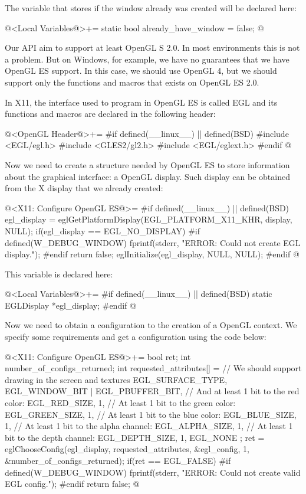 The variable that stores if the window already was created will be
declared here:

\iniciocodigo
@<Local Variables@>+=
static bool already_have_window = false;
@
\fimcodigo


Our API aim to support at least OpenGL S 2.0. In most environments
this is not a problem. But on Windows, for example, we have no
guarantees that we have OpenGL ES support. In this case, we should use
OpenGL 4, but we should support only the functions and macros that
exists on OpenGL ES 2.0.


In X11, the interface used to program in OpenGL ES is called EGL and
its functions and macros are declared in the following header:

\iniciocodigo
@<OpenGL Header@>+=
#if defined(__linux__) || defined(BSD)
#include <EGL/egl.h>
#include <GLES2/gl2.h>
#include <EGL/eglext.h>
#endif
@
\fimcodigo

Now we need to create a structure needed by OpenGL ES to store
information about the graphical interface: a OpenGL display. Such
display can be obtained from the X display that we already created:

\iniciocodigo
@<X11: Configure OpenGL ES@>=
#if defined(__linux__) || defined(BSD)
egl_display = eglGetPlatformDisplay(EGL_PLATFORM_X11_KHR, display,
                                    NULL);
if(egl_display == EGL_NO_DISPLAY){
#if defined(W_DEBUG_WINDOW)
  fprintf(stderr, "ERROR: Could not create EGL display.\n");
#endif
  return false;
}
eglInitialize(egl_display, NULL, NULL);
#endif
@
\fimcodigo

This variable is declared here:

\iniciocodigo
@<Local Variables@>+=
#if defined(__linux__) || defined(BSD)
static EGLDisplay *egl_display;
#endif
@
\fimcodigo

Now we need to obtain a configuration to the creation of a OpenGL
context. We specify some requirements and get a configuration using
the code below:

\iniciocodigo
@<X11: Configure OpenGL ES@>+=
{
  bool ret;
  int number_of_configs_returned;
  int requested_attributes[] = {
    // We should support drawing in the screen and textures
    EGL_SURFACE_TYPE,  EGL_WINDOW_BIT | EGL_PBUFFER_BIT,
    // And at least 1 bit to the red color:
    EGL_RED_SIZE, 1,
    // At least 1 bit to the green color:
    EGL_GREEN_SIZE, 1,
    // At least 1 bit to the blue color:
    EGL_BLUE_SIZE, 1,
    // At least 1 bit to the alpha channel:
    EGL_ALPHA_SIZE, 1,
    // At least 1 bit to the depth channel:
    EGL_DEPTH_SIZE, 1,
    EGL_NONE
  };
  ret = eglChooseConfig(egl_display, requested_attributes,
                        &egl_config, 1, &number_of_configs_returned);
  if(ret == EGL_FALSE){
#if defined(W_DEBUG_WINDOW)
    fprintf(stderr, "ERROR: Could not create valid EGL config.\n");
#endif
    return false;
  }
}
@
\fimcodigo

